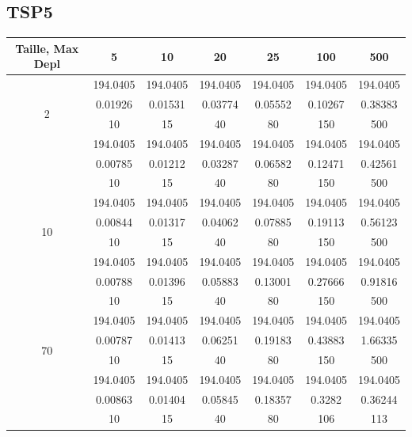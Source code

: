 \documentclass[12pt]{article}
\begin{document}
            \subsection{TSP5}
            \begin{tabular}{|c|c|c|c|c|c|c|}
                \hline
                {Taille, Max Depl} & 5 & 10 & 20 & 25 & 100 & 500 \\
                \hline
                \multirow{4}{*}{2} & 194.0405 & 194.0405 & 194.0405 & 194.0405 & 194.0405 & 194.0405  \\ & 0.01926 & 0.01531 & 0.03774 & 0.05552 & 0.10267 & 0.38383  \\ & 10 & 15 & 40 & 80 & 150 & 500  \\\hline
                \multirow{4}{*}{5} & 194.0405 & 194.0405 & 194.0405 & 194.0405 & 194.0405 & 194.0405  \\ & 0.00785 & 0.01212 & 0.03287 & 0.06582 & 0.12471 & 0.42561  \\ & 10 & 15 & 40 & 80 & 150 & 500  \\\hline
                \multirow{4}{*}{10} & 194.0405 & 194.0405 & 194.0405 & 194.0405 & 194.0405 & 194.0405  \\ & 0.00844 & 0.01317 & 0.04062 & 0.07885 & 0.19113 & 0.56123  \\ & 10 & 15 & 40 & 80 & 150 & 500  \\\hline
                \multirow{4}{*}{30} & 194.0405 & 194.0405 & 194.0405 & 194.0405 & 194.0405 & 194.0405  \\ & 0.00788 & 0.01396 & 0.05883 & 0.13001 & 0.27666 & 0.91816  \\ & 10 & 15 & 40 & 80 & 150 & 500  \\\hline
                \multirow{4}{*}{70} & 194.0405 & 194.0405 & 194.0405 & 194.0405 & 194.0405 & 194.0405  \\ & 0.00787 & 0.01413 & 0.06251 & 0.19183 & 0.43883 & 1.66335  \\ & 10 & 15 & 40 & 80 & 150 & 500  \\\hline
                \multirow{4}{*}{120} & 194.0405 & 194.0405 & 194.0405 & 194.0405 & 194.0405 & 194.0405  \\ & 0.00863 & 0.01404 & 0.05845 & 0.18357 & 0.3282 & 0.36244  \\ & 10 & 15 & 40 & 80 & 106 & 113  \\\hline    
            \end{tabular}
\end{document}
